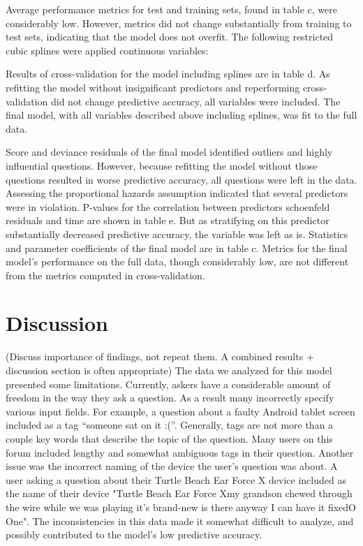 \documentclass{article}
\begin{document}
Average performance metrics for test and training sets, found in table c, were considerably low. However, metrics did not change substantially from training to test sets, indicating that the model does not overfit. The following restricted cubic splines were applied continuous variables:

Results of cross-validation for the model including splines are in table d. As refitting the model without insignificant predictors and reperforming cross-validation did not change predictive accuracy, all variables were included. The final model, with all variables described above including splines, was fit to the full data.

Score and deviance residuals of the final model identified outliers and highly influential questions. However, because refitting the model without those questions resulted in worse predictive accuracy, all questions were left in the data. Assessing the proportional hazards assumption indicated that several predictors were in violation. P-values for the correlation between predictors schoenfeld residuals and time are shown in table e. But as stratifying on this predictor substantially decreased predictive accuracy, the variable was left as is. Statistics and parameter coefficients of the final model are in table c. Metrics for the final model's performance on the full data, though considerably low, are not different from the metrics computed in cross-validation. 

\section*{Discussion}

(Discuss importance of findings, not repeat them. A combined results + discussion section is often appropriate) 
The data we analyzed for this model presented some limitations. Currently, askers have a considerable amount of freedom in the way they ask a question. As a result many incorrectly specify various input fields. For example, a question about a faulty Android tablet screen included as a tag ``someone sat on it :(''. Generally, tags are not more than a couple key words that describe the topic of the question. Many users on this forum included lengthy and somewhat ambiguous tags in their question. Another issue was the incorrect naming of the device the user's question was about. A user asking a question about their Turtle Beach Ear Force X device included as the name of their device "Turtle Beach Ear Force Xmy grandson chewed through the wire while we was playing it's brand-new is there anyway I can have it fixedO One". The inconsistencies in this data made it somewhat difficult to analyze, and possibly contributed to the model's low predictive accuracy. 
\end{document}
